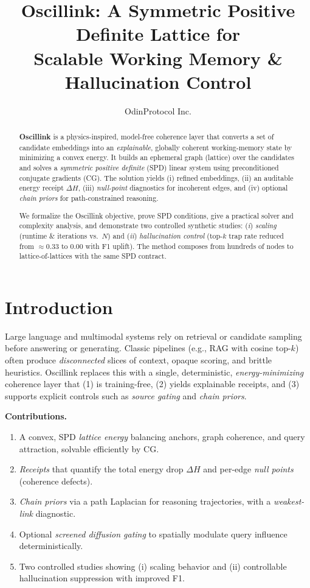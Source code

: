 \documentclass[11pt]{article}
\title{\vspace{-1.0em}
Oscillink: A Symmetric Positive Definite Lattice for\\
Scalable Working Memory \& Hallucination Control
\vspace{0.25em}}
\author{OdinProtocol Inc.\vspace{-0.5em}}
\date{}
\begin{document}
\maketitle

\begin{abstract}
\noindent
\textbf{Oscillink} is a physics-inspired, model-free coherence layer that converts a set of candidate embeddings into an \emph{explainable}, globally coherent working-memory state by minimizing a convex energy. It builds an ephemeral graph (lattice) over the candidates and solves a \emph{symmetric positive definite} (SPD) linear system using preconditioned conjugate gradients (CG). The solution yields (i) refined embeddings, (ii) an auditable energy receipt $\Delta H$, (iii) \emph{null-point} diagnostics for incoherent edges, and (iv) optional \emph{chain priors} for path-constrained reasoning.

We formalize the Oscillink objective, prove SPD conditions, give a practical solver and complexity analysis, and demonstrate two controlled synthetic studies: (\emph{i}) \emph{scaling} (runtime $\&$ iterations vs.~$N$) and (\emph{ii}) \emph{hallucination control} (top-$k$ trap rate reduced from $\approx 0.33$ to $0.00$ with F1 uplift). The method composes from hundreds of nodes to lattice-of-lattices with the same SPD contract.
\end{abstract}

\vspace{-0.75em}
\section{Introduction}
Large language and multimodal systems rely on retrieval or candidate sampling before answering or generating. Classic pipelines (e.g., RAG with cosine top-$k$) often produce \emph{disconnected} slices of context, opaque scoring, and brittle heuristics. Oscillink replaces this with a single, deterministic, \emph{energy-minimizing} coherence layer that (1) is training-free, (2) yields explainable receipts, and (3) supports explicit controls such as \emph{source gating} and \emph{chain priors}.

\vspace{0.25em}
\noindent
\textbf{Contributions.}
\begin{enumerate}
  \item A convex, SPD \emph{lattice energy} balancing anchors, graph coherence, and query attraction, solvable efficiently by CG.
  \item \emph{Receipts} that quantify the total energy drop $\Delta H$ and per-edge \emph{null points} (coherence defects).
  \item \emph{Chain priors} via a path Laplacian for reasoning trajectories, with a \emph{weakest-link} diagnostic.
  \item Optional \emph{screened diffusion gating} to spatially modulate query influence deterministically.
  \item Two controlled studies showing (i) scaling behavior and (ii) controllable hallucination suppression with improved F1.
\end{enumerate}
\end{document}
